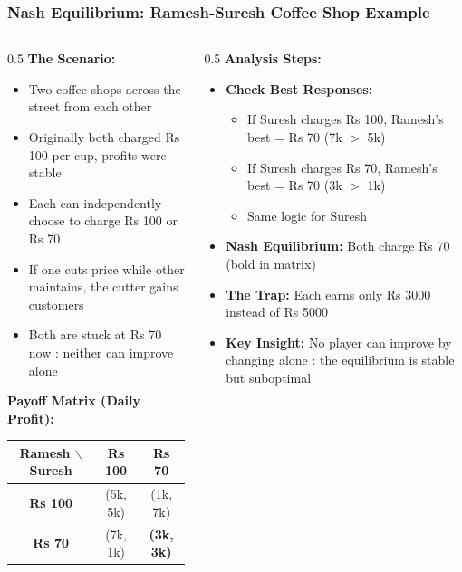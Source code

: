 \begin{frame}[fragile]\frametitle{Nash Equilibrium: Ramesh-Suresh Coffee Shop Example}
\begin{columns}
    \begin{column}[T]{0.5\linewidth}
      \textbf{The Scenario:}
      \begin{itemize}
        \item Two coffee shops across the street from each other
        \item Originally both charged Rs 100 per cup, profits were stable
        \item Each can independently choose to charge Rs 100 or Rs 70
        \item If one cuts price while other maintains, the cutter gains customers
        \item Both are stuck at Rs 70 now : neither can improve alone
      \end{itemize}
      
      \vspace{2pt}
      \textbf{Payoff Matrix (Daily Profit):}
      \begin{center}
      \begin{tabular}{|c|c|c|}
        \hline
        \textbf{Ramesh $\backslash$ Suresh} & \textbf{Rs 100} & \textbf{Rs 70} \\
        \hline
        \textbf{Rs 100} & (5k, 5k) & (1k, 7k) \\
        \hline
        \textbf{Rs 70} & (7k, 1k) & \textbf{(3k, 3k)} \\
        \hline
      \end{tabular}
      \end{center}
    \end{column}
    \begin{column}[T]{0.5\linewidth}
      \textbf{Analysis Steps:}
      \begin{itemize}
        \item \textbf{Check Best Responses:}
        \begin{itemize}
          \item If Suresh charges Rs 100, Ramesh's best = Rs 70 (7k $>$ 5k)
          \item If Suresh charges Rs 70, Ramesh's best = Rs 70 (3k $>$ 1k)
          \item Same logic for Suresh
        \end{itemize}
        \item \textbf{Nash Equilibrium:} Both charge Rs 70 (bold in matrix)
        \item \textbf{The Trap:} Each earns only Rs 3000 instead of Rs 5000
        \item \textbf{Key Insight:} No player can improve by changing alone : the equilibrium is stable but suboptimal
      \end{itemize}
    \end{column}
  \end{columns}
\end{frame}

